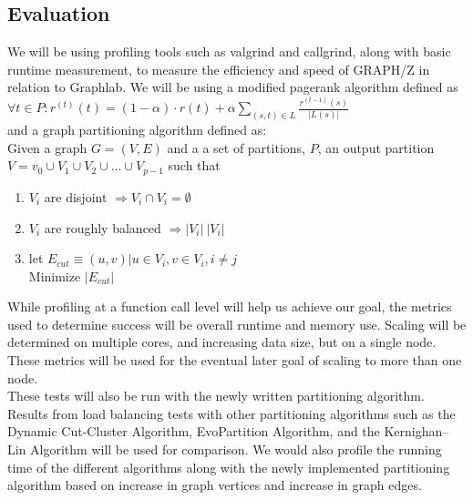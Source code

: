 \documentclass[10pt]{article}
\begin{document}
\begin{multicols}{2}
  \section{Evaluation}
  We will be using profiling tools such as valgrind and callgrind, along with basic runtime measurement, to measure the efficiency and speed of GRAPH/Z in relation to Graphlab. We will be using a modified pagerank algorithm defined as \\
  $\forall t \in P : r^{(t)}(t)  = (1-\alpha) \cdot r(t) + \alpha \sum_{(s,t) \in L} \frac{r^{(t-1)}(s)}{|L(s)|}$\\ 
  and a graph partitioning algorithm defined as:\\
  Given a graph $G = (V,E)$ and a a set of partitions, $P$, an output partition $V = v_0 \cup V_1 \cup V_2 \cup \ldots \cup V_{p-1}$ such that
  \begin{enumerate}
  \item ${V_i}$ are disjoint $\Rightarrow V_i \cap V_i = \emptyset$
  \item ${V_i}$ are roughly balanced $\Rightarrow |V_i| ~ |V_i|$
  \item let $E_{cut} \equiv {(u,v) | u \in V_i, v \in V_i, i \neq j}$\\
    Minimize $|E_{cut}|$
  \end{enumerate}
  While profiling at a function call level will help us achieve our goal, the metrics used to determine success will be overall runtime and memory use. Scaling will be determined on multiple cores, and increasing data size, but on a single node.  These metrics will be used for the eventual later goal of scaling to more than one node.\\
  These tests will also be run with the newly written partitioning algorithm. Results from load balancing tests with other partitioning algorithms such as the Dynamic Cut-Cluster Algorithm, EvoPartition Algorithm, and the Kernighan–Lin Algorithm will be used for comparison. We would also profile the running time of the different algorithms along with the newly implemented partitioning algorithm based on increase in graph vertices and increase in graph edges.
\end{multicols}
\end{document}
